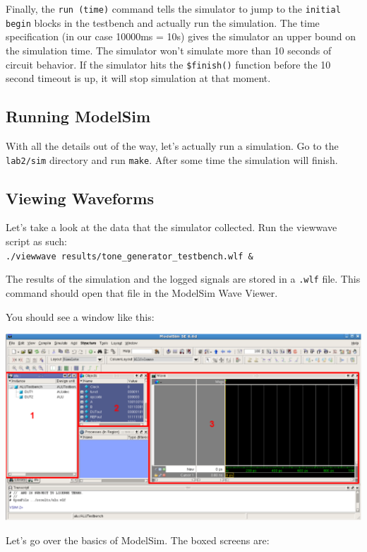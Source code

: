 \documentclass[11pt]{article}
\begin{document}
Finally, the \verb|run (time)| command tells the simulator to jump to the \verb|initial begin| blocks in the testbench and actually run the simulation. The time specification (in our case 10000ms = 10s) gives the simulator an upper bound on the simulation time. The simulator won't simulate more than 10 seconds of circuit behavior. If the simulator hits the \verb|$finish()| function before the 10 second timeout is up, it will stop simulation at that moment.

\subsection{Running ModelSim}

With all the details out of the way, let's actually run a simulation. Go to the \verb|lab2/sim| directory and run \verb|make|. After some time the simulation will finish.

\subsection{Viewing Waveforms}

Let's take a look at the data that the simulator collected. Run the viewwave script as such:\\

\verb|./viewwave results/tone_generator_testbench.wlf &|

The results of the simulation and the logged signals are stored in a \verb|.wlf| file. This command should open that file in the ModelSim Wave Viewer.

You should see a window like this:

\includegraphics[width=\textwidth]{images/modelsim.png}

Let's go over the basics of ModelSim. The boxed screens are:
\end{document}
